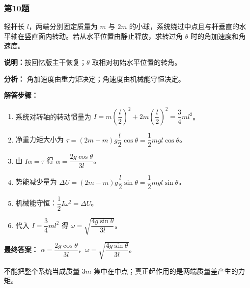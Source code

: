 \documentclass[12pt,a4paper]{ctexart}
\begin{document}
\subsubsection*{第10题}
\begin{tcolorbox}[colback=gray!2!white,colframe=black!60,title={题目}]
轻杆长 \(l\)，两端分别固定质量为 \(m\) 与 \(2m\) 的小球，系统绕过中点且与杆垂直的水平轴在竖直面内转动。若从水平位置由静止释放，求转过角 \(\theta\) 时的角加速度和角速度。\par
\vspace{0.4em}
\textbf{说明：}按回忆版主干恢复；\(\theta\) 取相对初始水平位置的转角。\par
\end{tcolorbox}
\begin{tcolorbox}[colback=blue!2!white,colframe=blue!55!black,title={完整答案}]
\textbf{分析：}
角加速度由重力矩决定；角速度由机械能守恒决定。\par
\textbf{解答步骤：}
\begin{enumerate}
\item 系统对转轴的转动惯量为 \(I=m\left(\dfrac l2\right)^2+2m\left(\dfrac l2\right)^2=\dfrac34 ml^2\)。
\item 净重力矩大小为 \(\tau=(2m-m)g\dfrac l2\cos\theta=\dfrac12 mgl\cos\theta\)。
\item 由 \(I\alpha=\tau\) 得 \(\alpha=\dfrac{2g\cos\theta}{3l}\)。
\item 势能减少量为 \(\Delta U=(2m-m)g\dfrac l2\sin\theta=\dfrac12 mgl\sin\theta\)。
\item 机械能守恒：\(\dfrac12 I\omega^2=\Delta U\)。
\item 代入 \(I=\dfrac34 ml^2\) 得 \(\omega=\sqrt{\dfrac{4g\sin\theta}{3l}}\)。
\end{enumerate}
\textbf{最终答案：}
\(\alpha=\dfrac{2g\cos\theta}{3l}\)，\(\omega=\sqrt{\dfrac{4g\sin\theta}{3l}}\)。\par
\end{tcolorbox}
\begin{tcolorbox}[colback=red!2!white,colframe=red!55!black,title={易错点}]
不能把整个系统当成质量 \(3m\) 集中在中点；真正起作用的是两端质量差产生的力矩。\par
\end{tcolorbox}
\end{document}
